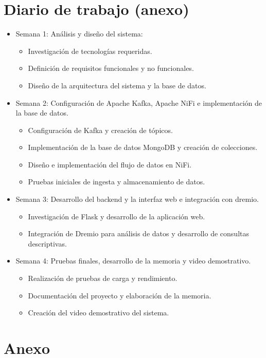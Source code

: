 \documentclass{../../../miPlantilla}
\begin{document}
\section{Diario de trabajo (anexo)}
\begin{itemize}
  \item Semana 1: Análisis y diseño del sistema:
  \begin{itemize}
    \item Investigación de tecnologías requeridas.
    \item Definición de requisitos funcionales y no funcionales.
    \item Diseño de la arquitectura del sistema y la base de datos.
  \end{itemize}
  \item Semana 2: Configuración de Apache Kafka, Apache NiFi e implementación de la base de datos.
  \begin{itemize}
    \item Configuración de Kafka y creación de tópicos.
    \item Implementación de la base de datos MongoDB y creación de colecciones.
    \item Diseño e implementación del flujo de datos en NiFi.
    \item Pruebas iniciales de ingesta y almacenamiento de datos.
  \end{itemize}
  \item Semana 3: Desarrollo del backend y la interfaz web e integración con dremio.
  \begin{itemize}
    \item Investigación de Flask y desarrollo de la aplicación web.
    \item Integración de Dremio para análisis de datos y desarrollo de consultas descriptivas.
  \end{itemize}
  \item Semana 4: Pruebas finales, desarrollo de la memoria y video demostrativo.
  \begin{itemize}
    \item Realización de pruebas de carga y rendimiento.
    \item Documentación del proyecto y elaboración de la memoria.
    \item Creación del video demostrativo del sistema.
  \end{itemize}
\end{itemize}

\section{Anexo}
\end{document}

